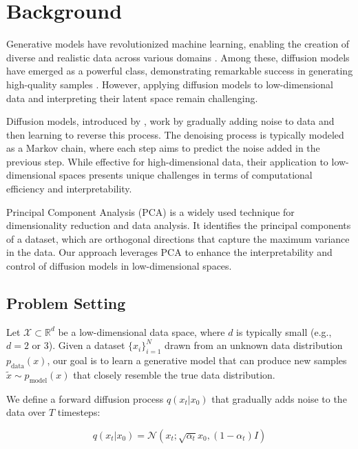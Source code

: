 \documentclass{article} %
\begin{document}
\section{Background}
\label{sec:background}

Generative models have revolutionized machine learning, enabling the creation of diverse and realistic data across various domains \cite{goodfellow2016deep}. Among these, diffusion models have emerged as a powerful class, demonstrating remarkable success in generating high-quality samples \cite{ddpm, yang2023diffusion}. However, applying diffusion models to low-dimensional data and interpreting their latent space remain challenging.

Diffusion models, introduced by \citet{pmlr-v37-sohl-dickstein15}, work by gradually adding noise to data and then learning to reverse this process. The denoising process is typically modeled as a Markov chain, where each step aims to predict the noise added in the previous step. While effective for high-dimensional data, their application to low-dimensional spaces presents unique challenges in terms of computational efficiency and interpretability.

Principal Component Analysis (PCA) is a widely used technique for dimensionality reduction and data analysis. It identifies the principal components of a dataset, which are orthogonal directions that capture the maximum variance in the data. Our approach leverages PCA to enhance the interpretability and control of diffusion models in low-dimensional spaces.

\subsection{Problem Setting}
\label{subsec:problem_setting}

Let $\mathcal{X} \subset \mathbb{R}^d$ be a low-dimensional data space, where $d$ is typically small (e.g., $d=2$ or $3$). Given a dataset $\{x_i\}_{i=1}^{N}$ drawn from an unknown data distribution $p_\text{data}(x)$, our goal is to learn a generative model that can produce new samples $\tilde{x} \sim p_\text{model}(x)$ that closely resemble the true data distribution.

We define a forward diffusion process $q(x_t|x_0)$ that gradually adds noise to the data over $T$ timesteps:

\begin{equation}
    q(x_t|x_0) = \mathcal{N}(x_t; \sqrt{\alpha_t}x_0, (1-\alpha_t)I)
\end{equation}
\end{document}
